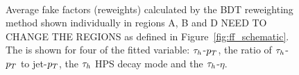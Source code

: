 \begin{figure}[!hbtp]
\centering
     \\
\caption{Average fake factors (reweights) calculated by the BDT reweighting method shown individually in regions A, B and D NEED TO CHANGE THE REGIONS as defined in Figure~\ref{fig:ff_schematic}. The is shown for four of the fitted variable: $\tau_{h}$-$p_{T}$, the ratio of $\tau_{h}$-$p_{T}$ to jet-$p_{T}$, the $\tau_{h}$ HPS decay mode and the $\tau_{h}$-$\eta$.}
\label{fig:4tau_ff_reweights}
\end{figure}

